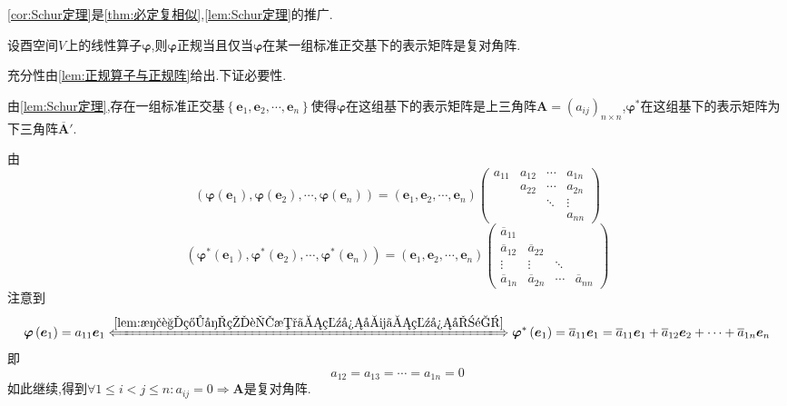 \begin{red}
    \begin{remark}
        \cref{cor:Schur定理}是\cref{thm:必定复相似},\cref{lem:Schur定理}的推广.
    \end{remark}
\end{red}
\begin{formal}
    \begin{theorem}[正规的判定]\label{thm:正规的判定}
        设酉空间$V$上的线性算子$\bm{\varphi}$,则$\bm{\varphi}$正规当且仅当$\bm{\varphi}$在某一组标准正交基下的表示矩阵是复对角阵.
    \end{theorem}
    \begin{Proof}
        充分性由\cref{lem:正规算子与正规阵}给出.下证必要性.

        由\cref{lem:Schur定理},存在一组标准正交基$\left\{
            \bm{e}_1,\bm{e}_2,\cdots,\bm{e}_n
        \right\}$使得$\bm{\varphi}$在这组基下的表示矩阵是上三角阵$\bm{A}=\left(
            a_{ij}
        \right)_{
            n\times n
        }$,$\bm{\varphi}^*$在这组基下的表示矩阵为下三角阵$\overline{\bm{A}}'$.

        由\[
        \left(
            \bm{\varphi}\left(
                \bm{e}_1
              \right),\bm{\varphi}\left(
                  \bm{e}_2
                \right),\cdots,\bm{\varphi}\left(
                    \bm{e}_n
                    \right)                
        \right)=\left(
            \bm{e}_1,\bm{e}_2,\cdots,\bm{e}_n
        \right)\begin{pmatrix}
           a_{11}&a_{12}&\cdots&a_{1n}\\
              &a_{22}&\cdots&a_{2n}\\
                &&\ddots&\vdots\\
                &&&a_{nn}
        \end{pmatrix}
        \]\[
        \left(
            \bm{\varphi}^*\left(
                \bm{e}_1
              \right),\bm{\varphi}^*\left(
                  \bm{e}_2
                \right),\cdots,\bm{\varphi}^*\left(
                    \bm{e}_n
                    \right)
        \right)=\left(
            \bm{e}_1,\bm{e}_2,\cdots,\bm{e}_n
        \right)\begin{pmatrix}
            \overline{a}_{11}&&&\\
            \overline{a}_{12}&\overline{a}_{22}&&\\
            \vdots&\vdots&\ddots&\\
            \overline{a}_{1n}&\overline{a}_{2n}&\cdots&\overline{a}_{nn}
        \end{pmatrix}
        \]注意到\[
        \bm{\varphi}\left(
            \bm{e}_1
        \right)=a_{11}\bm{e}_1\xLongleftrightarrow{\cref{lem:正规算子的范数、特征值、特征向量}}\bm{\varphi}^*\left(
            \bm{e}_1
        \right)=\overline{a}_{11}\bm{e}_1=\overline{a}_{11}\bm{e}_1+\overline{a}_{12}\bm{e}_2+\cdots+\overline{a}_{1n}\bm{e}_n
        \]即\[
        a_{12}=a_{13}=\cdots=a_{1n}=0
        \]如此继续,得到$\forall 1\leqslant i<j\leqslant n:a_{ij}=0\Longrightarrow\bm{A}$是复对角阵.
    \end{Proof}
\end{formal}

